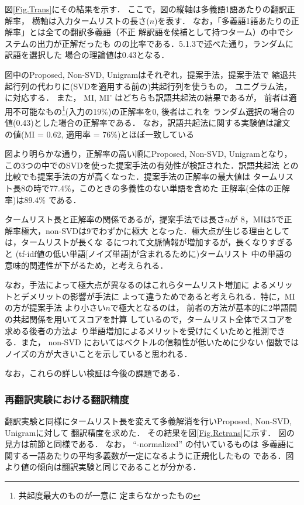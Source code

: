 図\ref{Fig.Trans}にその結果を示す．
ここで，図の縦軸は多義語1語あたりの翻訳正解率，
横軸は入力タームリストの長さ($n$)を表す．
なお，「多義語1語あたりの正解率」とは全ての翻訳多義語（不正
解訳語を候補として持つターム）の中でシステムの出力が正解だったも
のの比率である．5.1.3で述べた通り，ランダムに訳語を選択した
場合の理論値は0.43となる．

図中のProposed, Non-SVD, Unigramはそれぞれ，提案手法，提案手法で
縮退共起行列の代わりに(SVDを適用する前の)共起行列を使うもの，
ユニグラム法，に対応する． 
また， MI, MI'
はどちらも訳語共起法の結果であるが，
前者は適用不可能なもの\footnote{共起度最大のものが一意に
定まらなかったもの}(入力の19\%)の正解率を0, 後者はこれを
ランダム選択の場合の値(0.43)とした場合の正解率である． 
なお，訳語共起法に関する実験値は論文
\cite{Tanaka96}の値(MI = 0.62, 適用率 = 76\%)とほぼ一致している

図より明らかな通り，正解率の高い順にProposed, Non-SVD, Unigramとなり，
この3つの中でのSVDを使った提案手法の有効性が検証された．訳語共起法
との比較でも提案手法の方が高くなった．提案手法の正解率の最大値は
タームリスト長8の時で77.4\%，このときの多義性のない単語を含めた
正解率(全体の正解率)は89.4\% である．

タームリスト長と正解率の関係であるが，提案手法では長さ$n$が
8，MIは5で正解率極大，non-SVDは9でわずかに極大
となった．極大点が生じる理由としては，タームリストが長くな
るにつれて文脈情報が増加するが，長くなりすぎると
(tf-idf値の低い単語[ノイズ単語]が含まれるために)タームリスト
中の単語の意味的関連性が下がるため，と考えられる．

なお，手法によって極大点が異なるのはこれらタームリスト増加に
よるメリットとデメリットの影響が手法に
よって違うためであると考えられる．特に，MIの方が提案手法
より小さい$n$で極大となるのは，
前者の方法が基本的に2単語間の共起関係を用いてスコアを計算
しているので，タームリスト全体でスコアを求める後者の方法よ
り単語増加によるメリットを受けにくいためと推測できる．また，
non-SVD においてはベクトルの信頼性が低いために少ない
個数ではノイズの方が大きいことを示していると思われる．

なお，これらの詳しい検証は今後の課題である．

\subsubsection{再翻訳実験における翻訳精度}

翻訳実験と同様にタームリスト長を変えて多義解消を行いProposed, Non-SVD, 
Unigramに対して 翻訳精度を求めた． その結果を図\ref{Fig.Retrans}に示す． 
図の見方は前節と同様である． なお， ``-normalized'' の付いているものは
多義語に関する一語あたりの平均多義数が一定になるように正規化したもの
である．図より値の傾向は翻訳実験と同じであることが分かる． 

